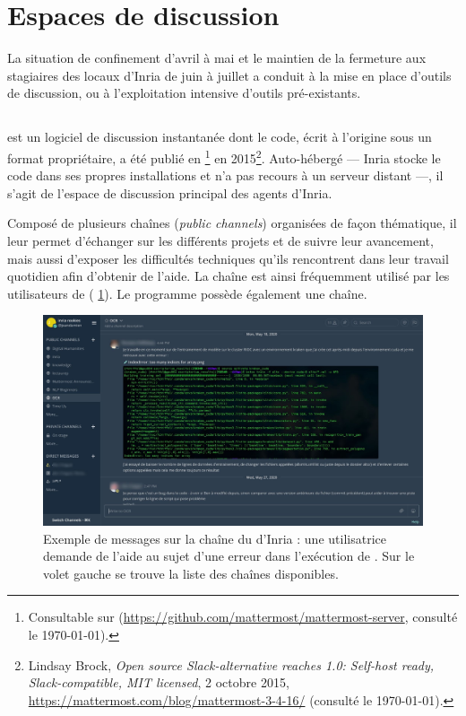 \section{Espaces de discussion}

La situation de confinement d'avril à mai et le maintien de la fermeture aux stagiaires des locaux d'Inria de juin à juillet a conduit à la mise en place d'outils de discussion, ou à l'exploitation intensive d'outils pré-existants.

\subsection{\Mattermost}

\Mattermost{} est un logiciel de discussion instantanée dont le code, écrit à l'origine sous un format propriétaire, a été publié en \opensource{}\footnote{Consultable sur \github{} (\url{https://github.com/mattermost/mattermost-server}, consulté le \today).} en 2015\footnote{Lindsay Brock, \textit{Open source Slack-alternative reaches 1.0: Self-host ready, Slack-compatible, MIT licensed}, 2 octobre 2015, \url{https://mattermost.com/blog/mattermost-3-4-16/} (consulté le \today).}. Auto-hébergé --- Inria stocke le code dans ses propres installations et n'a pas recours à un serveur distant ---, il s'agit de l'espace de discussion principal des agents d'Inria.

Composé de plusieurs \og chaînes \fg{} (\textit{public channels}) organisées de façon thématique, il leur permet d'échanger sur les différents projets et de suivre leur avancement, mais aussi d'exposer les difficultés techniques qu'ils rencontrent dans leur travail quotidien afin d'obtenir de l'aide. La chaîne \og \ocr \fg{} est ainsi fréquemment utilisé par les utilisateurs de \kraken{} (\fig{} \ref{fig:mattermost}). Le programme \timeus{} possède également une chaîne.

\begin{figure}
    \centering
    \includegraphics[width=16cm]{img/mattermost.jpg}
    \caption{Exemple de messages sur la chaîne \og \ocr \fg{} du \Mattermost{} d'Inria : une utilisatrice demande de l'aide au sujet d'une erreur dans l'exécution de \kraken{}. Sur le volet gauche se trouve la liste des chaînes disponibles.}
    \label{fig:mattermost}
\end{figure}

